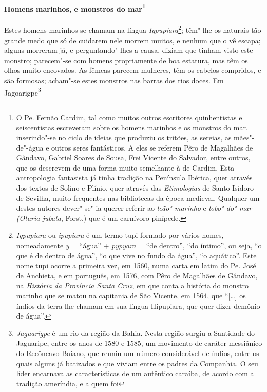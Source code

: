 \begin{linenumbers}
\paragraph[Homens marinhos, e monstros do mar]{Homens marinhos,
e monstros do mar\protect\footnote{ O Pe. Fernão
Cardim, tal como muitos outros escritores quinhentistas e seiscentistas
escreveram sobre os homens marinhos e os monstros do mar, inserindo"-se
no ciclo de ideias que produziu os tritões, as sereias, as mães"-de"-água
e outros seres fantásticos. A eles se referem Pêro de Magalhães de Gândavo,
Gabriel Soares de Sousa, Frei Vicente do Salvador, entre outros, que os
descrevem de uma forma muito semelhante à de Cardim. Esta antropologia
fantasista já tinha tradição na Península Ibérica, quer através dos
textos de Solino e Plínio, quer através das \textit{Etimologias} de
Santo Isidoro de Sevilha, muito frequentes nas bibliotecas da época
medieval. Qualquer um destes autores dever"-se"-ia querer referir ao
\textit{leão"-marinho} e \textit{lobo"-do"-mar (Otaria jubata}, Forst.)
que é um carnívoro pinípede.}}  \quad
Estes homens marinhos se chamam na língua \textit{Igpupiara}\footnote{ \textit{Igpupiara} 
ou \textit{ipupiara} é um termo tupi
formado por vários nomes, nomeadamente \textit{y} = ``água'' +
\textit{pypyara} = ``de dentro'', ``do íntimo'', ou seja, ``o que é de
dentro de água'', ``o que vive no fundo da água'', ``o aquático''. Este
nome tupi ocorre a primeira vez, em 1560, numa carta em latim do Pe.
José de Anchieta, e em português, em 1576, com Pêro de Magalhães de Gândavo,
na \textit{História da Província Santa Cruz}, em que conta a
história do monstro marinho que se matou na capitania de São Vicente,
em 1564, que ``[\ldots{}] os índios da terra lhe chamam em sua língua
Hipupiara, que quer dizer demônio de água''.}; têm"-lhe os naturais tão
grande medo que só de cuidarem nele morrem muitos, e nenhum que o vê
escapa; alguns morreram já, e perguntando"-lhes a causa, diziam que
tinham visto este monstro; parecem"-se com homens propriamente de boa
estatura, mas têm os olhos muito encovados. As fêmeas parecem mulheres,
têm os cabelos compridos, e são formosas; acham"-se estes monstros nas
barras dos rios doces. Em Jagoarigpe\footnote{ \textit{Jaguarigpe} é
um rio da região da Bahia. Nesta região surgiu a Santidade do
Jaguaripe, entre os anos de 1580 e 1585, um movimento de caráter
messiânico do Recôncavo Baiano, que reuniu um número considerável de
índios, entre os quais alguns já batizados e que viviam entre os
padres da Companhia. O seu líder encarnava as características de um
autêntico caraíba, de acordo com a tradição ameríndia, e a quem foi
}
\end{linenumbers}
